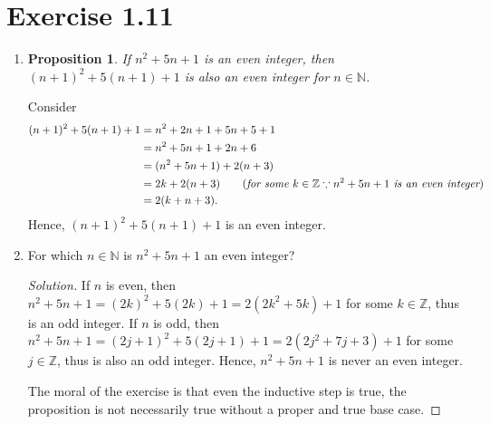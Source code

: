 \documentclass{article}
\newtheorem{proposition}[thm]{Proposition}
\begin{document}
\section*{Exercise 1.11}
\begin{enumerate}[label=(\alph*)]
    \item \begin{proposition}
        If $n^2 + 5n + 1$ is an even integer, then $(n+1)^2 + 5(n+1) + 1$ is also an even integer 
        for $n \in \mathbb{N}$.
    \end{proposition}

    Consider 
    \begin{align*}
        (n+1)^2 + 5(n+1) + 1 & = n^2 + 2n + 1 + 5n + 5 + 1 \\
        & = n^2 + 5n + 1 + 2n + 6 \\
        & = (n^2 + 5n + 1) + 2(n+3) \\
        & = 2k + 2(n+3) \qquad (\emph{for some } k \in \mathbb{Z} \because \emph{$n^2 + 5n + 1$ is 
        an even integer}) \\
        & = 2(k + n + 3).
    \end{align*}
    Hence, $(n+1)^2 + 5(n+1) + 1$ is an even integer.

    \item For which $n \in \mathbb{N}$ is $n^2 + 5n + 1$ an even integer?
    \begin{proof}[Solution]
        If $n$ is even, then $n^2 + 5n + 1 = (2k)^2 + 5(2k) + 1 = 2(2k^2 + 5k) + 1$ for some $k \in 
        \mathbb{Z}$, thus is an odd integer. If $n$ is odd, then $n^2 + 5n + 1 = (2j+1)^2 + 5(2j+1)
        + 1 = 2(2j^2 + 7j + 3) + 1$ for some $j \in \mathbb{Z}$, thus is also an odd integer. 
        Hence, $n^2 + 5n + 1$ is never an even integer.

        The moral of the exercise is that even the inductive step is true, the proposition is not
        necessarily true without a proper and true base case.
    \end{proof}
\end{enumerate}
\bigbreak
\end{document}
